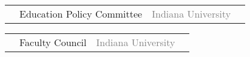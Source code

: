 \documentclass[11pt]{cooperCV_v1/cooperCV} %
\begin{document}
\begin{minipage}{\textwidth}
        \textcolor{gray}{{\emph{}}} 
        \begin{tabular}{ p{} %
                        p{}
                        p{} 
                        p{}} %
        \small &  Education Policy Committee & {\hfill}\textcolor{gray}{\small{Indiana University}} & {\hfill}\small{ }\\ 
        \end{tabular}
      
        \textcolor{gray}{{\emph{}}} 
        \begin{tabular}{ p{} %
                        p{}
                        p{} 
                        p{}} %
        \small &  Faculty Council & {\hfill}\textcolor{gray}{\small{Indiana University}} & {\hfill}\small{ }\\ 
        \end{tabular}
      
  
 

%
 

\end{minipage}





%


\selectfont
\end{document}
